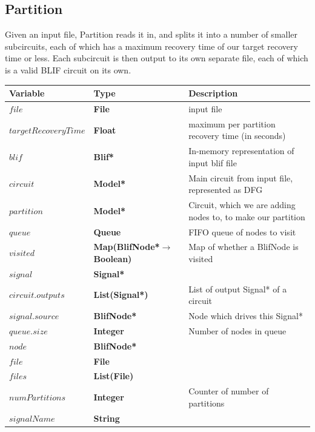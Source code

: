 \documentclass[12pt,final,oneside]{dwThesis} %
\begin{document}
   \newpage \subsection{Partition}\label{algPartition} Given an input file,
   Partition reads it in, and splits it into a number of smaller subcircuits,
   each of which has a maximum recovery time of our target recovery time or
   less. Each subcircuit is then output to its own separate file, each of which
   is a valid \gls{BLIF} circuit on its own.  \begin{table} \begin{center}
         \begin{tabularx}{\linewidth}{llX} \toprule Variable & Type &
            Description\\ \midrule $file$ &\textbf{ File  } &  input file\\
            $targetRecoveryTime$ &\textbf{ Float } &  maximum per partition
            recovery time (in seconds)\\ $blif$ &\textbf{  Blif* } &  In-memory
            representation of input blif file\\ $circuit$ &\textbf{   Model* }
            &  Main circuit from input file, represented as DFG\\ $partition$
            &\textbf{   Model* } &  Circuit, which we are adding nodes to, to
            make our partition\\ $queue$ &\textbf{  Queue } &  FIFO queue of
            nodes to visit\\ $visited$ &\textbf{   Map(BlifNode*$\to$ Boolean)}
            &  Map of whether a BlifNode is visited\\ $signal$ &\textbf{
               Signal* } &  \\ $circuit.outputs$ &\textbf{  List(Signal*) } &
            List of output Signal* of a circuit\\ $signal.source$ &\textbf{
               BlifNode* } &  Node which drives this Signal*\\ $queue.size$
            &\textbf{ Integer } &  Number of nodes in queue\\ $node$ &\textbf{
               BlifNode* } &  \\ $file$ &\textbf{  File } &  \\ $files$
            &\textbf{  List(File) } &  \\ $numPartitions$ &\textbf{ Integer } &
            Counter of number of partitions\\ $signalName$ &\textbf{ String } &

\end{tabularx}
\end{center}
\end{table}
\end{document}
